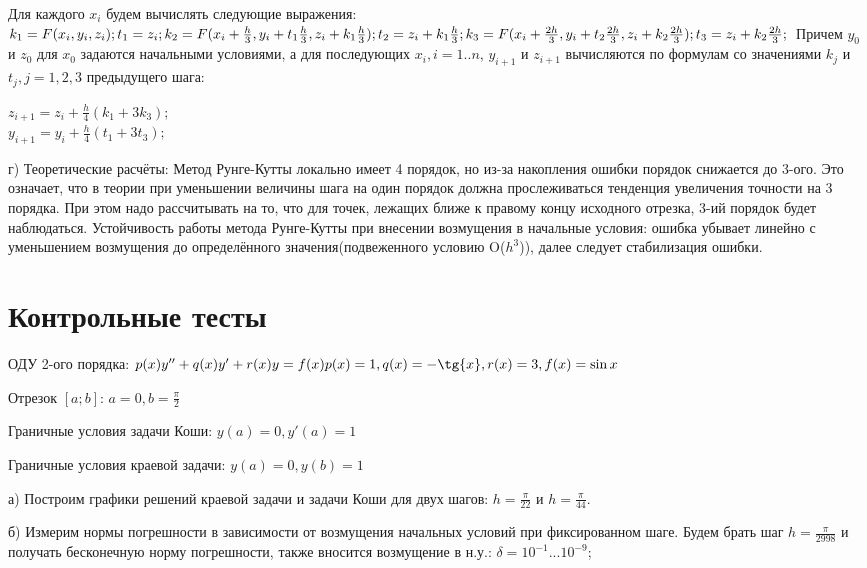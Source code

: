 \documentclass{article}
\begin{document}
	Для каждого $x_i$ будем вычислять следующие выражения:\\
	$k_1 = F(x_i, y_i, z_i);\\
	t_1 = z_i;\\ \\
	k_2 = F(x_i + \frac{h}{3}, y_i + t_1\frac{h}{3}, z_i + k_1\frac{h}{3});\\
	t_2 = z_i + k_1\frac{h}{3};\\ \\
	k_3 = F(x_i + \frac{2h}{3}, y_i + t_2\frac{2h}{3}, z_i + k_2\frac{2h}{3});\\
	t_3 = z_i + k_2\frac{2h}{3};\\ \\$
	Причем $y_0$ и $z_0$ для $x_0$ задаются начальными условиями, а для последующих $x_i, i = 1..n$, $y_{i+1}$ и $z_{i+1}$ вычисляются по формулам со значениями $k_j$ и $t_j, j = 1,2,3$ предыдущего шага: 

	\begin{center}
		$z_{i+1} = z_i + \frac{h}{4}(k_1 + 3k_3);$\\
		$y_{i+1} = y_i + \frac{h}{4}(t_1 + 3t_3);$
	\end{center}
	
	
	г) Теоретические расчёты: Метод Рунге-Кутты локально имеет 4 порядок, но из-за накопления ошибки порядок снижается до 3-ого. Это означает, что в теории при уменьшении величины шага на один порядок должна прослеживаться тенденция увеличения точности на 3 порядка. При этом надо рассчитывать на то, что для точек, лежащих ближе к правому концу исходного отрезка, 3-ий порядок будет наблюдаться. Устойчивость работы метода Рунге-Кутты при внесении возмущения в начальные условия: ошибка убывает линейно с уменьшением возмущения до определённого значения(подвеженного условию O($h^3$)), далее следует стабилизация ошибки.
	
	\section{Контрольные тесты}
	ОДУ 2-ого порядка: $p(x)y'' + q(x)y' + r(x)y = f(x)\\p(x) = 1, q(x) = - \tg{x},r(x) = 3, f(x) = \sin{x}$\par
	Отрезок $[a;b]$: $a = 0, b=\frac{\pi}{2}$\par
	Граничные условия задачи Коши: $y(a) = 0, y'(a) = 1$ \par
	Граничные условия краевой задачи: $y(a) = 0, y(b) = 1$ \par
	а) Построим графики решений краевой задачи и задачи Коши для двух шагов: $h = \frac{\pi}{22}$ и $h = \frac{\pi}{44}$. \par
	б) Измерим нормы погрешности в зависимости от возмущения начальных условий при фиксированном шаге. Будем брать шаг $h = \frac{\pi}{2998}$ и получать бесконечную норму погрешности, также вносится возмущение в н.у.: $\delta  = 10^{-1}...10^{-9}$;
	
\end{document}
